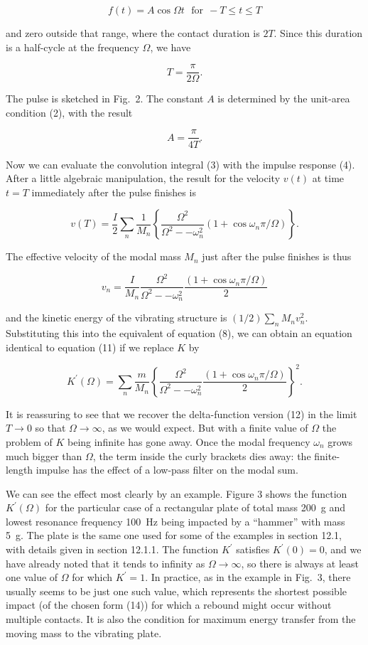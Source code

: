   $$f(t)=A \cos \Omega t \mathrm{~~~for~~} -T \le t \le T \tag{14}$$ 

  and zero outside that range, where the contact duration is $2T$. Since this 
  duration is a half-cycle at the frequency $\Omega$, we have 

  $$T=\dfrac{\pi}{2 \Omega}. \tag{15}$$ 

  The pulse is sketched in Fig.\ 2. The constant $A$ is determined by the 
  unit-area condition (2), with the result 

  $$A=\dfrac{\pi}{4T}. \tag{16}$$ 

  Now we can evaluate the convolution integral (3) with the impulse response 
  (4). After a little algebraic manipulation, the result for the velocity 
  $v(t)$ at time $t=T$ immediately after the pulse finishes is 

  $$v(T)=\dfrac{I}{2} \sum_n{\dfrac{1}{M_n} \left\lbrace 
  \dfrac{\Omega^2}{\Omega^2 -- \omega_n^2} (1 + \cos \omega_n \pi/\Omega) 
  \right\rbrace} . \tag{17}$$ 

  The effective velocity of the modal mass $M_n$ just after the pulse finishes 
  is thus 

  $$v_n=\dfrac{I}{M_n} \dfrac{\Omega^2}{\Omega^2 -- \omega_n^2} \dfrac{(1 + 
  \cos \omega_n \pi/\Omega)}{2} \tag{18}$$ 

  and the kinetic energy of the vibrating structure is $(1/2)\sum_n{M_n 
  v_n^2}$. Substituting this into the equivalent of equation (8), we can obtain 
  an equation identical to equation (11) if we replace $K$ by 

  $$K^\prime (\Omega) = \sum_n{\dfrac{m}{M_n} \left\lbrace 
  \dfrac{\Omega^2}{\Omega^2 -- \omega_n^2} \dfrac{(1 + \cos \omega_n 
  \pi/\Omega)}{2} \right\rbrace^2} . \tag{19}$$ 

  It is reassuring to see that we recover the delta-function version (12) in 
  the limit $T \rightarrow 0$ so that $\Omega \rightarrow\infty$, as we would 
  expect. But with a finite value of $\Omega$ the problem of $K$ being infinite 
  has gone away. Once the modal frequency $\omega_n$ grows much bigger than 
  $\Omega$, the term inside the curly brackets dies away: the finite-length 
  impulse has the effect of a low-pass filter on the modal sum. 

  We can see the effect most clearly by an example. Figure 3 shows the function 
  $K^\prime(\Omega)$ for the particular case of a rectangular plate of total 
  mass 200~g and lowest resonance frequency 100~Hz being impacted by a 
  ``hammer'' with mass 5~g. The plate is the same one used for some of the 
  examples in section 12.1, with details given in section 12.1.1. The function 
  $K^\prime$ satisfies $K^\prime(0)=0$, and we have already noted that it tends 
  to infinity as $\Omega \rightarrow \infty$, so there is always at least one 
  value of $\Omega$ for which $K^\prime=1$. In practice, as in the example in 
  Fig.\ 3, there usually seems to be just one such value, which represents the 
  shortest possible impact (of the chosen form (14)) for which a rebound might 
  occur without multiple contacts. It is also the condition for maximum energy 
  transfer from the moving mass to the vibrating plate. 

